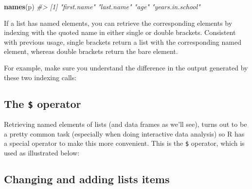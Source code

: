 \documentclass[]{book}
\newenvironment{Shaded}{\begin{snugshade}}{\end{snugshade}}
\newcommand{\CommentTok}[1]{\textcolor[rgb]{0.56,0.35,0.01}{\textit{#1}}}
\newcommand{\KeywordTok}[1]{\textcolor[rgb]{0.13,0.29,0.53}{\textbf{#1}}}
\newcommand{\NormalTok}[1]{#1}
\newcommand{\OperatorTok}[1]{\textcolor[rgb]{0.81,0.36,0.00}{\textbf{#1}}}
\newcommand{\StringTok}[1]{\textcolor[rgb]{0.31,0.60,0.02}{#1}}
\theoremstyle{definition}
\theoremstyle{definition}
\theoremstyle{definition}
\theoremstyle{remark}
\begin{document}
\begin{Shaded}
\begin{Highlighting}[]
\KeywordTok{names}\NormalTok{(p)}
\CommentTok{#> [1] "first.name"      "last.name"       "age"             "years.in.school"}
\end{Highlighting}
\end{Shaded}

If a list has named elements, you can retrieve the corresponding
elements by indexing with the quoted name in either single or double
brackets. Consistent with previous usage, single brackets return a list
with the corresponding named element, whereas double brackets return the
bare element.

For example, make sure you understand the difference in the output
generated by these two indexing calls:

\begin{Shaded}
\end{Shaded}

\hypertarget{the-operator}{%
\subsection{\texorpdfstring{The \texttt{\$}
operator}{The \$ operator}}\label{the-operator}}

Retrieving named elements of lists (and data frames as we'll see), turns
out to be a pretty common task (especially when doing interactive data
analysis) so R has a special operator to make this more convenient. This
is the \texttt{\$} operator, which is used as illustrated below:

\begin{Shaded}
\end{Shaded}

\hypertarget{changing-and-adding-lists-items}{%
\subsection{Changing and adding lists
items}\label{changing-and-adding-lists-items}}
\end{document}
